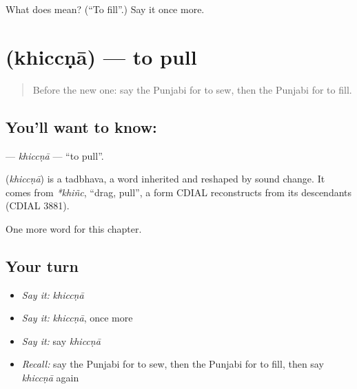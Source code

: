 \begin{tcolorbox}[breakable,colback=teal!4,colframe=teal!35!black,title={Before you move on}]
What does  mean? (\textquotedblleft{}To fill\textquotedblright{}.) Say it once more.
\end{tcolorbox}
\section[\texorpdfstring{\pa{ਖਿੱਚਣਾ} (khiccṇā)}{ਖਿੱਚਣਾ (khiccṇā)}]{ (khiccṇā) — to pull}

\label{lesson:PA-C150-khiccna}



\begin{quote}
Before the new one: say the Punjabi for to sew, then the Punjabi for to fill.
\end{quote}

\subsection*{You'll want to know: }
\textbf{} — \emph{khiccṇā} — \textquotedblleft{}to pull\textquotedblright{}.

\begin{cousinweb}
\textbf{} (\emph{khiccṇā}) is a tadbhava, a word inherited and reshaped by sound change. It comes from \emph{*khiñc}, \textquotedblleft{}drag, pull\textquotedblright{}, a form CDIAL reconstructs from its descendants (CDIAL 3881).
\end{cousinweb}

\begin{grammarlens}[title={What you've built}]
One more word for this chapter.
\end{grammarlens}

\subsection*{Your turn}
\begin{itemize}
\raggedright
  \item \emph{Say it:} \emph{khiccṇā}
  \item \emph{Say it:} \emph{khiccṇā}, once more
  \item \emph{Say it:} say \emph{khiccṇā}
  \item \emph{Recall:} say the Punjabi for to sew, then the Punjabi for to fill, then say \emph{khiccṇā} again
\end{itemize}

